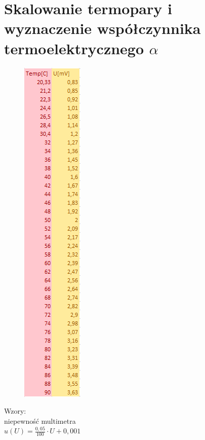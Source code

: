 \documentclass{article}
\begin{document}
\section{Skalowanie termopary i wyznaczenie współczynnika termoelektrycznego $\alpha$}
\begin{figure}[h]
    \begin{center}
    \includegraphics[scale=0.5]{wyniki.PNG}
    \end{center}
\end{figure}
Wzory:\\
niepewność multimetra\\
$u(U)=\frac{0,05}{100}\cdot U+0,001$\\
\end{document}
